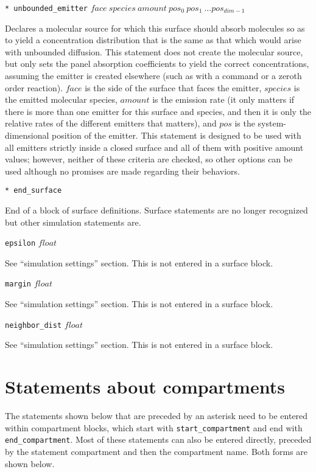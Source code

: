 \documentclass {scrbook}
\newcommand {\ttt} {\texttt}
\begin{document}
\begin{description}
\item{\ttt{* unbounded\_emitter} $face\ species\ amount\ pos_0\ pos_1\ ... pos_{dim-1}$}

Declares a molecular source for which this surface should absorb molecules so as to yield a concentration distribution that is the same as that which would arise with unbounded diffusion. This statement does not create the molecular source, but only sets the panel absorption coefficients to yield the correct concentrations, assuming the emitter is created elsewhere (such as with a command or a zeroth order reaction). $face$ is the side of the surface that faces the emitter, $species$ is the emitted molecular species, $amount$ is the emission rate (it only matters if there is more than one emitter for this surface and species, and then it is only the relative rates of the different emitters that matters), and $pos$ is the system-dimensional position of the emitter. This statement is designed to be used with all emitters strictly inside a closed surface and all of them with positive amount values; however, neither of these criteria are checked, so other options can be used although no promises are made regarding their behaviors.

\item{\ttt{* end\_surface}}

End of a block of surface definitions. Surface statements are no longer recognized but other simulation statements are.

\item{\ttt{epsilon} $float$}

See ``simulation settings'' section. This is not entered in a surface block.

\item{\ttt{margin} $float$}

See ``simulation settings'' section. This is not entered in a surface block.

\item{\ttt{neighbor\_dist} $float$}

See ``simulation settings'' section. This is not entered in a surface block.

\end{description}

\section{Statements about compartments}

The statements shown below that are preceded by an asterisk need to be entered within compartment blocks, which start with \ttt{start\_compartment} and end with \ttt{end\_compartment}. Most of these statements can also be entered directly, preceded by the statement compartment and then the compartment name. Both forms are shown below.
\end{document}

